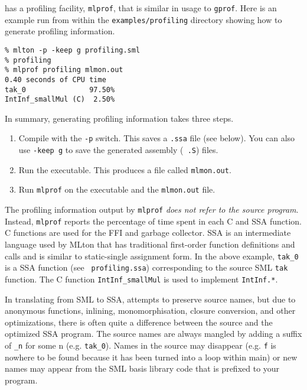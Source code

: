 
{\mlton} has a profiling facility, {\tt mlprof}, that is similar in usage
to {\tt gprof}.  Here is an example run from within the {\tt examples/profiling}
directory showing how to generate profiling information.

\begin{verbatim}
% mlton -p -keep g profiling.sml
% profiling
% mlprof profiling mlmon.out
0.40 seconds of CPU time
tak_0               97.50%
IntInf_smallMul (C)  2.50%
\end{verbatim}
In summary, generating profiling information takes three steps.
\begin{enumerate}

\item Compile with the {\tt -p} switch.  This saves a {\tt .ssa} file (see
below).  You can also use {\tt -keep g} to save the generated assembly ({\tt
.S}) files.

\item Run the executable.  This produces a file called {\tt mlmon.out}.

\item Run {\tt mlprof} on the executable and the {\tt mlmon.out} file.

\end{enumerate}
The profiling information output by {\tt mlprof} {\em does not refer to the
source program}.  Instead, {\tt mlprof} reports the percentage of time spent in
each C and SSA function.  C functions are used for the FFI and garbage
collector.  SSA is an intermediate language used by MLton that has traditional
first-order function definitions and calls and is similar to static-single
assignment form.  In the above example, {\tt tak\_0} is a SSA function (see {\tt
profiling.ssa}) corresponding to the source SML {\tt tak} function.  The C
function {\tt IntInf\_smallMul} is used to implement {\tt IntInf.*}.

In translating from SML to SSA, {\mlton} attempts to preserve source names, but
due to anonymous functions, inlining, monomorphisation, closure conversion, and
other optimizations, there is often quite a difference between the source and
the optimized SSA program.  The source names are always mangled by adding a
suffix of {\tt \_n} for some n (e.g. {\tt tak\_0}).  Names in the source may
disappear (e.g. {\tt f} is nowhere to be found because it has been turned into a
loop within main) or new names may appear from the SML basis library code that
is prefixed to your program.

